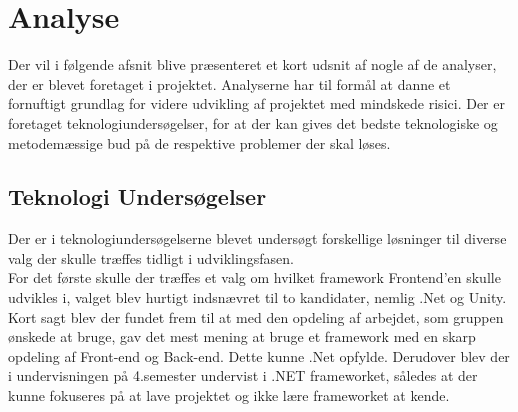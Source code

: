 \section{Analyse}
Der vil i følgende afsnit blive præsenteret et kort udsnit af nogle af de analyser, der er blevet foretaget i projektet. Analyserne har til formål at danne et fornuftigt grundlag for videre udvikling af
projektet med mindskede risici. Der er foretaget teknologiundersøgelser, for at der kan gives det bedste teknologiske og metodemæssige bud på de respektive problemer der skal løses.

\subsection{Teknologi Undersøgelser}
Der er i teknologiundersøgelserne blevet undersøgt forskellige løsninger til diverse valg der skulle træffes tidligt i udviklingsfasen.\\
For det første skulle der træffes et valg om hvilket framework Frontend'en skulle udvikles i, valget blev hurtigt indsnævret til to kandidater, nemlig .Net og Unity. Kort sagt blev der fundet frem til at med den opdeling af arbejdet, som gruppen ønskede at bruge, gav det mest mening at bruge et framework med en skarp opdeling af Front-end og Back-end. Dette kunne .Net opfylde. Derudover blev der i undervisningen på 4.semester undervist i .NET frameworket, således at der kunne fokuseres på at lave projektet og ikke lære frameworket at kende. 